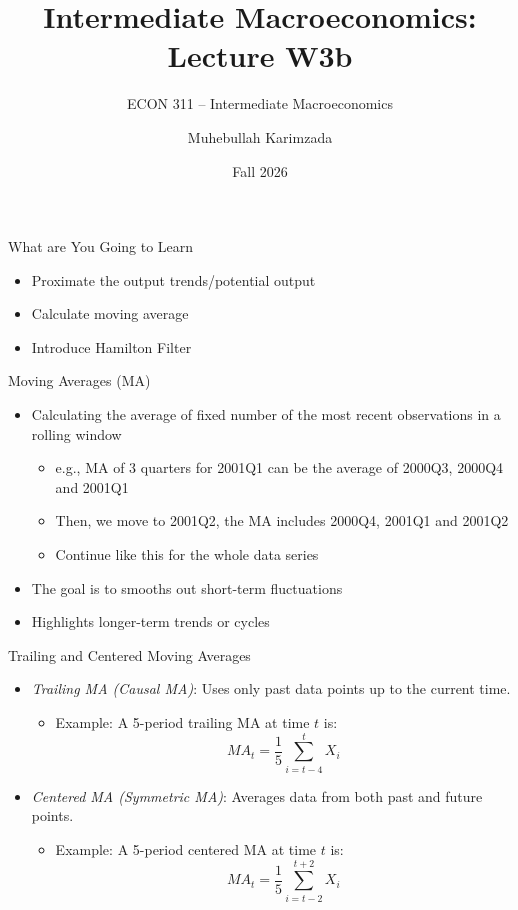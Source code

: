 \documentclass[aspectratio=1610]{beamer}
\title[Winter - Lecture 3b] %
{Intermediate Macroeconomics: Lecture  W3b }
\subtitle{ECON 311 -- Intermediate Macroeconomics}
\author{Muhebullah Karimzada}
\institute{School of Economics \\\ University of Northern British Columbia}
\date{Fall 2026}
\begin{document}
\begin{frame}[plain]
  \titlepage
\end{frame}

\begin{frame}[wide]{What are You Going to Learn }
	\begin{itemize}
		\item Proximate the output trends/potential output
		\item Calculate moving average
		\item Introduce Hamilton Filter
	\end{itemize}
\end{frame}

\begin{frame}[wide]{Moving Averages (MA)}
	\begin{itemize}
		\item Calculating the average of fixed number of the most recent observations in a rolling window
		\vspace{2mm}
		\begin{itemize}
			\item e.g., MA of 3 quarters for 2001Q1 can be the average of 2000Q3, 2000Q4 and 2001Q1
			\item Then, we move to 2001Q2, the MA includes 2000Q4, 2001Q1 and 2001Q2
			\item Continue like this for the whole data series
		\end{itemize}
		\item The goal is to smooths out short-term fluctuations
		\item Highlights longer-term trends or cycles
	\end{itemize}
\end{frame}

\begin{frame}[wide]{Trailing and Centered Moving Averages}
	\begin{itemize}
		\item \textit{Trailing MA (Causal MA)}: Uses only past data points up to the current time.
		\begin{itemize}
			\item Example: A 5-period trailing MA at time \( t \) is:  
		\[
		MA_t = \frac{1}{5} \sum_{i=t-4}^{t} X_i
		\]
		\end{itemize}
		\item \textit{Centered MA (Symmetric MA)}: Averages data from both past and future points.
		\begin{itemize}
			\item Example: A 5-period centered MA at time \( t \) is:
		\[
		MA_t = \frac{1}{5} \sum_{i=t-2}^{t+2} X_i
		\]
		\end{itemize}
	\end{itemize}
\end{frame}
\end{document}
